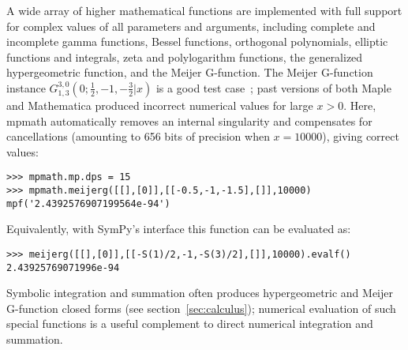 A wide array of higher mathematical functions are implemented
with full support for complex values of all parameters and arguments,
including complete and incomplete gamma functions,
Bessel functions, orthogonal polynomials, elliptic functions and integrals,
zeta and polylogarithm functions,
the generalized hypergeometric function, and the Meijer G-function.
The Meijer G-function instance
$G_{1, 3}^{3, 0}\left(0 ; \tfrac{1}{2}, -1, - \tfrac{3}{2} | x \right)$
is a good test case~\cite{Toth2007}; past versions of both Maple and
Mathematica produced incorrect numerical values for large $x > 0$.
Here, mpmath automatically removes an internal singularity
and compensates for cancellations (amounting to 656 bits
of precision when $x = 10000$), giving correct values:
\begin{verbatim}
>>> mpmath.mp.dps = 15
>>> mpmath.meijerg([[],[0]],[[-0.5,-1,-1.5],[]],10000)
mpf('2.4392576907199564e-94')
\end{verbatim}

Equivalently, with SymPy's interface this function can be evaluated as:
\begin{verbatim}
>>> meijerg([[],[0]],[[-S(1)/2,-1,-S(3)/2],[]],10000).evalf()
2.43925769071996e-94
\end{verbatim}

Symbolic integration and summation often produces hypergeometric
and Meijer G-function closed forms (see section~\ref{sec:calculus});
numerical evaluation of such special functions is a useful complement
to direct numerical integration and summation.
